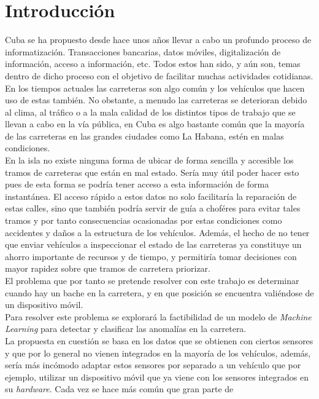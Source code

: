 \chapter*{Introducción}\label{chapter:introduction}

Cuba se ha propuesto desde hace unos años llevar a cabo un profundo proceso de informatización.
Transacciones bancarias, datos móviles, digitalización de información, acceso a información, etc. Todos
estos han sido, y aún son, temas dentro de dicho proceso con el objetivo de facilitar muchas actividades
cotidianas. En los tiempos actuales las carreteras son algo común y los vehículos que hacen uso de estas
también. No obstante, a menudo las carreteras se deterioran debido al clima, al tráfico o a la mala calidad 
de los distintos tipos de trabajo que se llevan a cabo en la vía pública, en Cuba es algo bastante común que
la mayoría de las carreteras en las grandes ciudades como La Habana, estén en malas condiciones.\\
\indent En la isla no existe ninguna forma de ubicar de forma sencilla y accesible los tramos de carreteras que están en
mal estado. Sería muy útil poder hacer esto pues de esta forma se podría tener acceso a esta información de forma
instantánea. El acceso rápido a estos datos no solo facilitaría la reparación de estas calles, sino que también
podría servir de guía a choféres para evitar tales tramos y por tanto consecuencias ocasionadas por estas condiciones
como accidentes y daños a la estructura de los vehículos. Además, el hecho de no tener que enviar vehículos a
inspeccionar el estado de las carreteras ya constituye un ahorro importante de recursos y de tiempo, y permitiría
tomar decisiones con mayor rapidez sobre que tramos de carretera priorizar.\\
\indent El problema que por tanto se pretende resolver con este trabajo es determinar cuando hay un bache en la carretera, y en que
posición se encuentra valiéndose de un dispositivo móvil.\\
\indent Para resolver este problema se explorará la factibilidad de un modelo de \emph{Machine Learning} para detectar y clasificar
las anomalías en la carretera.\\
\indent La propuesta en cuestión se basa en los datos que se obtienen con ciertos sensores y que por lo general no vienen integrados
en la mayoría de los vehículos, además, sería más incómodo adaptar estos sensores por separado a un vehículo que por ejemplo, utilizar
un dispositivo móvil que ya viene con los sensores integrados en su \emph{hardware}. Cada vez se hace más común que gran parte de 
